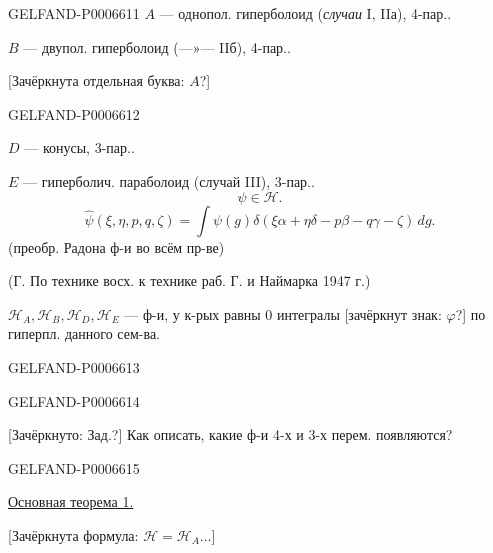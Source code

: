 \begin{GelfandAdjacentEvidence}{GELFAND-P000661}{1}
\(A\) --- однопол. гиперболоид (\textit{случаи} I, IIа), 4-пар..

\(B\) --- двупол. гиперболоид (---»--- IIб), 4-пар..

[Зачёркнута отдельная буква: \(A\)?]
\end{GelfandAdjacentEvidence}
\begin{GelfandAdjacentEvidence}{GELFAND-P000661}{2}


\(D\) --- конусы, 3-пар..

\(E\) --- гиперболич. параболоид (случай III), 3-пар..
\[
\psi\in\mathcal H.
\]
\[
\widehat\psi(\xi,\eta,p,q,\zeta)=
\int\psi(g)\delta(\xi\alpha+\eta\delta-p\beta-q\gamma-\zeta)\,dg.
\]
(преобр. Радона ф-и во всём пр-ве)

(Г. По технике восх. к технике раб. Г. и Наймарка 1947 г.)

\(\mathcal H_A,\mathcal H_B,\mathcal H_D,\mathcal H_E\) --- ф-и, у к-рых равны 0 интегралы
[зачёркнут знак: \(\varphi\)?] по гиперпл. данного сем-ва.
\end{GelfandAdjacentEvidence}
\begin{GelfandAdjacentEvidence}{GELFAND-P000661}{3}

\end{GelfandAdjacentEvidence}
\begin{GelfandAdjacentEvidence}{GELFAND-P000661}{4}


[Зачёркнуто: Зад.?] Как описать, какие ф-и 4-х и 3-х перем. появляются?
\end{GelfandAdjacentEvidence}
\begin{GelfandAdjacentEvidence}{GELFAND-P000661}{5}


\underline{Основная теорема 1.}

[Зачёркнута формула: \(\mathcal H=\mathcal H_A\ldots\)]
\end{GelfandAdjacentEvidence}
